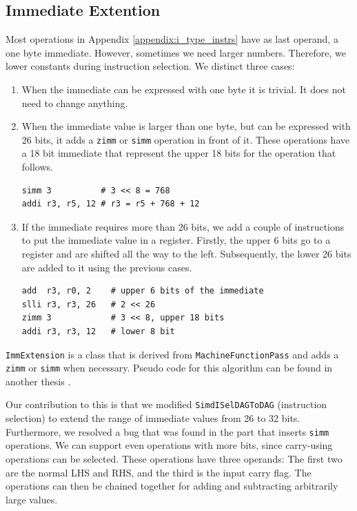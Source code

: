 \subsection{Immediate Extention}\label{sec:immediate_ext}
Most operations in Appendix \ref{appendix:i_type_instrs} have as last operand, a one byte immediate. However, sometimes we need larger numbers. Therefore, we lower constants during instruction selection. We distinct three cases:
\begin{enumerate}
\item When the immediate can be expressed with one byte it is trivial. It does not need to change anything.
\item When the immediate value is larger than one byte, but can be expressed with 26 bits, it adds a \texttt{zimm} or \texttt{simm} operation in front of it. These operations have a 18 bit immediate that represent the upper 18 bits for the operation that follows.

\begin{lstlisting}
simm 3          # 3 << 8 = 768
addi r3, r5, 12 # r3 = r5 + 768 + 12
\end{lstlisting}
\item If the immediate requires more than 26 bits, we add a couple of instructions to put the immediate value in a register. Firstly, the upper 6 bits go to a register and are shifted all the way to the left. Subsequently, the lower 26 bits are added to it using the previous cases.
\begin{lstlisting}
add  r3, r0, 2    # upper 6 bits of the immediate
slli r3, r3, 26   # 2 << 26
zimm 3            # 3 << 8, upper 18 bits
addi r3, r3, 12   # lower 8 bit
\end{lstlisting}
\end{enumerate}

\texttt{ImmExtension} is a class that is derived from \texttt{MachineFunctionPass} and adds a \texttt{zimm} or \texttt{simm} when necessary. Pseudo code for this algorithm can be found in another thesis \cite[Appendix B]{liu_zhenyuan}. 

Our contribution to this is that we modified \texttt{SimdISelDAGToDAG} (instruction selection) to extend the range of immediate values from 26 to 32 bits. Furthermore, we resolved a bug that was found in the part that inserts \texttt{simm} operations. We can support even operations with more bits, since carry-using operations can be selected. These operations have three operands: The first two are the normal LHS and RHS, and the third is the input carry flag. The operations can then be chained together for adding and subtracting arbitrarily large values.

